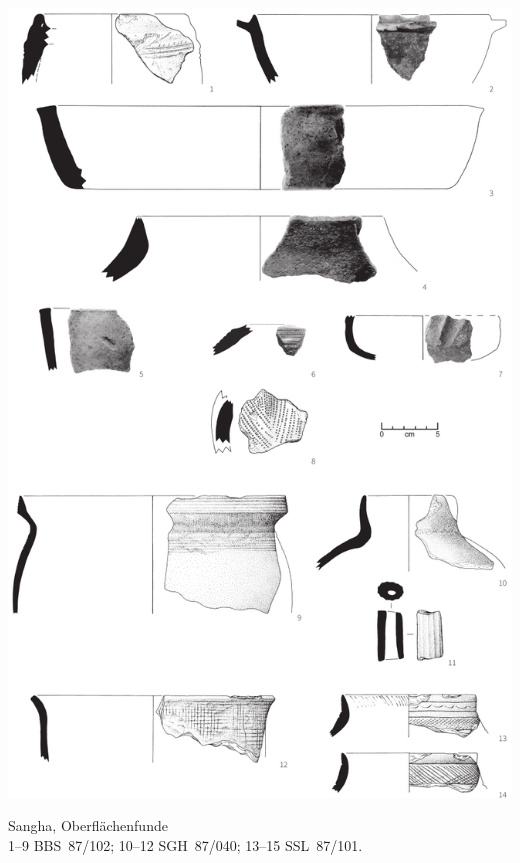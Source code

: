 \begin{pl}[H]
	\includegraphics{plt/Taf35.pdf}
	\vspace{.75em}\caption{\mbox{Sangha}, Oberflächenfunde \\ 1--9 BBS~87/102; 10--12 SGH~87/040; 13--15 SSL~87/101.}
	\label{pl:35}
\end{pl}

